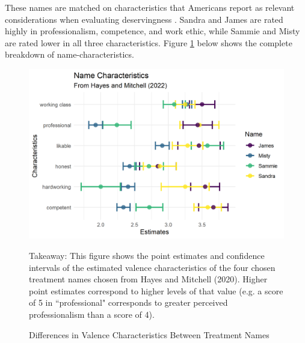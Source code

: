 \documentclass[12pt]{article}%
\begin{document}
\begin{doublespace}
These names are matched on characteristics that Americans report as relevant considerations when evaluating deservingness \citep{bobocel_justice-based_1998, katz_racial_1988, sniderman_symbolic_1986, sniderman_beyond_1996, mclosky_ethos}. Sandra and James are rated highly in professionalism, competence, and work ethic, while Sammie and Misty are rated lower in all three characteristics. Figure \ref{characteristics} below shows the complete breakdown of name-characteristics.

\begin{figure}[h!]
	\centering
	\includegraphics[scale=1]{figs/characteristics.png}
	{\singlespacing
		\parbox{0.75\textwidth}{\scriptsize%
			Takeaway: This figure shows the point estimates and confidence intervals of the estimated valence characteristics of the four chosen treatment names chosen from Hayes and Mitchell (2020). Higher point estimates correspond to higher levels of that value (e.g. a score of 5 in ``professional" corresponds to greater perceived professionalism than a score of 4).
	}}
	\caption{Differences in Valence Characteristics Between Treatment Names}
	\label{characteristics}
\end{figure}


\end{doublespace}
\end{document}
